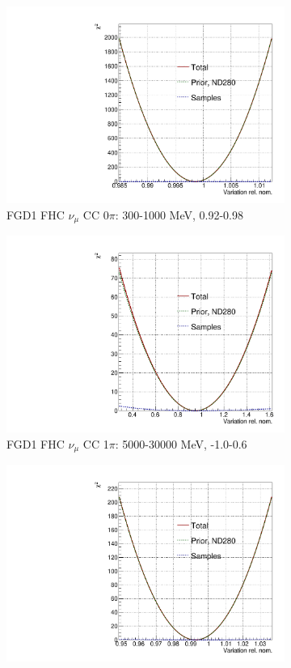 \begin{figure}[!htbp]
\centering
\begin{subfigure}{.49\textwidth}
  \centering
  \includegraphics[width=0.7\linewidth]{figs/llh/ndd_13_llh.pdf}
  \caption{FGD1 FHC $\nu_{\mu}$ CC 0$\pi$: 300-1000 MeV, 0.92-0.98}
\end{subfigure}
\begin{subfigure}{.49\textwidth}
  \centering
  \includegraphics[width=0.7\linewidth]{figs/llh/ndd_136_llh.pdf}
  \caption{FGD1 FHC $\nu_{\mu}$ CC 1$\pi$: 5000-30000 MeV, -1.0-0.6}
\end{subfigure}
\begin{subfigure}{.49\textwidth}
  \centering
  \includegraphics[width=0.7\linewidth]{figs/llh/ndd_541_llh.pdf}

\end{subfigure}
\end{figure}
